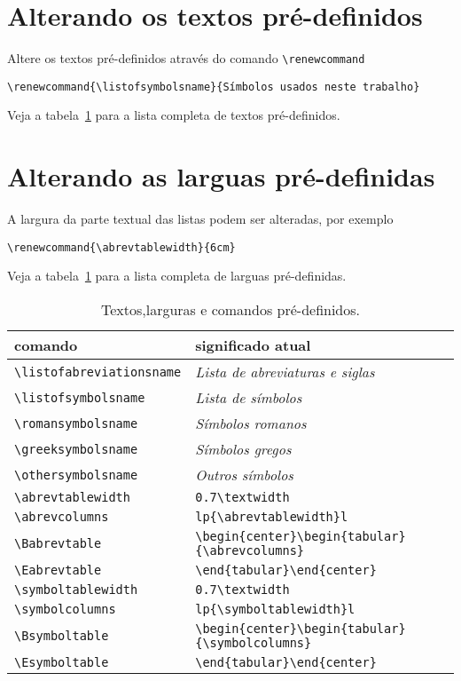\documentclass[espacosimples]{abnt}
\begin{document}
\section{Alterando os textos pré-definidos}

Altere os textos pré-definidos através do comando \verb+\renewcommand+
\begin{verbatim}
\renewcommand{\listofsymbolsname}{Símbolos usados neste trabalho}
\end{verbatim}
Veja a tabela~\ref{textos} para a lista completa de textos pré-definidos.

\section{Alterando as larguas pré-definidas}

A largura da parte textual das listas podem ser alteradas, por exemplo
\begin{verbatim}
\renewcommand{\abrevtablewidth}{6cm}
\end{verbatim}
Veja a tabela~\ref{textos} para a lista completa de larguas pré-definidas.

\begin{table}[htbp]
\begin{center}
\begin{tabular}{ll}\hline\hline
comando & significado atual\\ \hline
\verb+\listofabreviationsname+ & \emph{Lista de abreviaturas e siglas}\\
\verb+\listofsymbolsname+ & \emph{Lista de símbolos}\\
\verb+\romansymbolsname+ & \emph{Símbolos romanos}\\
\verb+\greeksymbolsname+ & \emph{Símbolos gregos}\\
\verb+\othersymbolsname+ & \emph{Outros símbolos}\\ \hline
\verb+\abrevtablewidth+ & \verb+0.7\textwidth+\\
\verb+\abrevcolumns+ & \verb+lp{\abrevtablewidth}l+\\
\verb+\Babrevtable+ & \verb+\begin{center}\begin{tabular}{\abrevcolumns}+\\
\verb+\Eabrevtable+ & \verb+\end{tabular}\end{center}+\\
\verb+\symboltablewidth+ & \verb+0.7\textwidth+\\
\verb+\symbolcolumns+ & \verb+lp{\symboltablewidth}l+\\
\verb+\Bsymboltable+ & \verb+\begin{center}\begin{tabular}{\symbolcolumns}+\\
\verb+\Esymboltable+ & \verb+\end{tabular}\end{center}+\\
\hline\hline
\end{tabular}
\caption{Textos,larguras e comandos pré-definidos.}
\label{textos}
\end{center}
\end{table}
\end{document}
